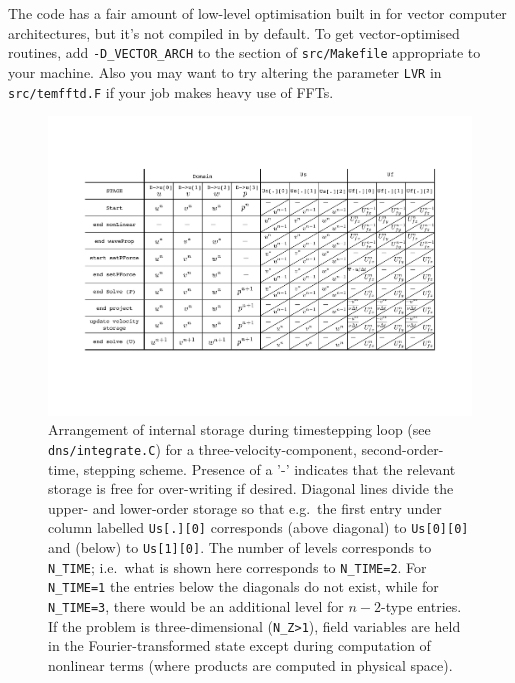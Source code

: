 \documentclass[11pt]{report}
\newcommand{\eg}{e.g.\ } \newcommand{\CC}{\mathrm{c.c.}}
\begin{document}
The code has a fair amount of low-level optimisation built in for
vector computer architectures, but it's not compiled in by default. To
get vector-optimised routines, add \verb+-D_VECTOR_ARCH+ to the
section of \texttt{src/Makefile} appropriate to your machine. Also you
may want to try altering the parameter \texttt{LVR} in
\texttt{src/temfftd.F} if your job makes heavy use of FFTs.

\begin{figure}
\begin{center}
\includegraphics[viewport=72 130 770 492,width=\textwidth,clip=true]
{timeSchemeStorage}
\end{center}
\caption{Arrangement of internal storage during timestepping loop (see
  \texttt{dns/integrate.C}) for a three-velocity-component,
  second-order-time, stepping scheme. Presence of a '-' indicates that
  the relevant storage is free for over-writing if desired.  Diagonal
  lines divide the upper- and lower-order storage so that \eg the
  first entry under column labelled \texttt{Us[.][0]} corresponds
  (above diagonal) to \texttt{Us[0][0]} and (below) to
  \texttt{Us[1][0]}.
%
  The number of levels corresponds to
  \texttt{N\_TIME}; i.e.\ what is shown here corresponds to
  \texttt{N\_TIME=2}.  For \texttt{N\_TIME=1} the entries below the
  diagonals do not exist, while for \texttt{N\_TIME=3}, there would be
  an additional level for $n-2$-type entries.
%
  If the problem is three-dimensional (\texttt{N\_Z>1}), field
  variables are held in the Fourier-transformed state except during
  computation of nonlinear terms (where products are computed in
  physical space). }
\label{fig.storage}
\end{figure}
\end{document}
